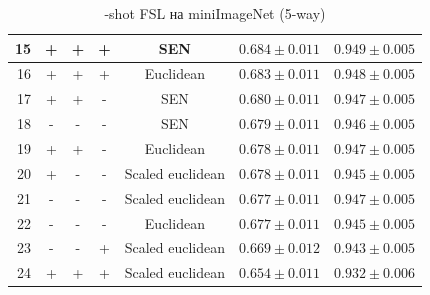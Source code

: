 \documentclass[a4paper, 12pt]{report}
\begin{document}
\begin{table}[h!]
\begin{adjustbox}{center}
\begin{tabular}{| r | c c c c | c |  c | }
    \hline
 15 & +               & +      & +      & SEN              & $0.684 \pm 0.011$ & $0.949 \pm 0.005$ \\
    \hline
 16 & +               & +      & +      & Euclidean        & $0.683 \pm 0.011$ & $0.948 \pm 0.005$ \\
    \hline
 17 & +               & +      & -      & SEN              & $0.680 \pm 0.011$ & $0.947 \pm 0.005$ \\
    \hline
 18 & -               & -      & -      & SEN              & $0.679 \pm 0.011$ & $0.946 \pm 0.005$ \\
    \hline
 19 & +               & +      & -      & Euclidean        & $0.678 \pm 0.011$ & $0.947 \pm 0.005$ \\
    \hline
 20 & +               & -      & -      & Scaled euclidean & $0.678 \pm 0.011$ & $0.945 \pm 0.005$ \\
    \hline
 21 & -               & -      & -      & Scaled euclidean & $0.677 \pm 0.011$ & $0.947 \pm 0.005$ \\
    \hline
 22 & -               & -      & -      & Euclidean        & $0.677 \pm 0.011$ & $0.945 \pm 0.005$ \\
    \hline
 23 & -               & -      & +      & Scaled euclidean & $0.669 \pm 0.012$ & $0.943 \pm 0.005$ \\
    \hline
 24 & +               & +      & +      & Scaled euclidean & $0.654 \pm 0.011$ & $0.932 \pm 0.006$ \\
\hline
\end{tabular}
\end{adjustbox}
\caption{-shot FSL на miniImageNet (5-way)}
\end{table}
 
\end{document}
